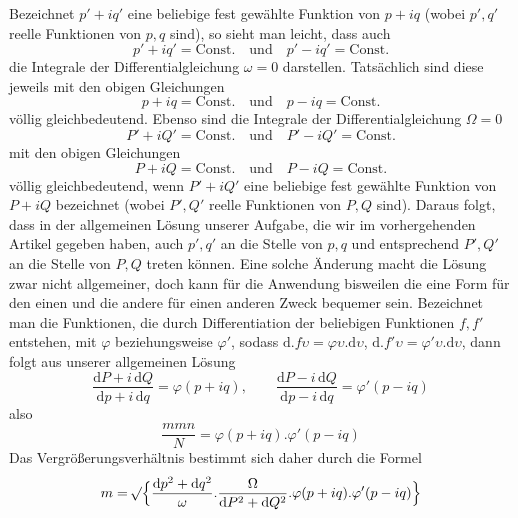 Bezeichnet \(p'+iq'\) eine beliebige fest gewählte Funktion von \(p+iq\) (wobei \(p',q'\) reelle Funktionen von \(p,q\) sind), so sieht man leicht, dass auch
\[
p'+iq'=\text{Const.}\quad\text{und}\quad p'-iq'=\text{Const.}
\]
\noindent die Integrale der Differentialgleichung \(\omega=0\) darstellen. Tatsächlich sind diese jeweils mit den obigen Gleichungen
\[
p+iq=\text{Const.}\quad\text{und}\quad p-iq=\text{Const.}
\]
\noindent völlig gleichbedeutend. Ebenso sind die Integrale der Differentialgleichung \(\Omega=0\)
\[
P'+iQ'=\text{Const.}\quad\text{und}\quad P'-iQ'=\text{Const.}
\]
\noindent mit den obigen Gleichungen
\[
P+iQ=\text{Const.}\quad\text{und}\quad P-iQ=\text{Const.}
\]
\noindent völlig gleichbedeutend, wenn \(P'+iQ'\) eine beliebige fest gewählte Funktion von \(P+iQ\) bezeichnet (wobei \(P',Q'\) reelle Funktionen von \(P,Q\) sind). Daraus folgt, dass in der allgemeinen Lösung unserer Aufgabe, die wir im vorhergehenden Artikel gegeben haben, auch \(p',q'\) an die Stelle von \(p,q\) und entsprechend \(P',Q'\) an die Stelle von \(P,Q\) treten können. Eine solche Änderung macht die Lösung zwar nicht allgemeiner, doch kann für die Anwendung bisweilen die eine Form für den einen und die andere für einen anderen Zweck bequemer sein.
Bezeichnet man die Funktionen, die durch Differentiation der beliebigen Funktionen \(f,f'\) entstehen, mit \(\varphi\) beziehungsweise \(\varphi'\), sodass \(\mathrm{d}\mathord{.}f\upsilon=\varphi\upsilon\mathord{.}\mathrm{d}\upsilon\), \(\mathrm{d}\mathord{.}f'\upsilon=\varphi'\upsilon\mathord{.}\mathrm{d}\upsilon\), dann folgt aus unserer allgemeinen Lösung
\[
\frac{\mathrm{d}P+i\,\mathrm{d}Q}{\mathrm{d}p+i\,\mathrm{d}q}=\varphi(p+iq),\qquad
\frac{\mathrm{d}P-i\,\mathrm{d}Q}{\mathrm{d}p-i\,\mathrm{d}q}=\varphi'(p-iq)
\]
\noindent also
\[
\frac{mmn}{N}=\varphi(p+iq)\mathord{.}\varphi'(p-iq)
\]
\noindent Das Vergrößerungsverhältnis bestimmt sich daher durch die Formel
\[
m=\mathord{{}^{}\!\surd}\Bigl\{\frac{\mathrm{d}p^2+\mathrm{d}q^2}{\omega}\mathord{.}\frac{\Omega}{\mathrm{d}P^2+\mathrm{d}Q^2}\mathord{.}\varphi(p+iq)\mathord{.}\varphi'(p-iq)\Bigr\}
\]

